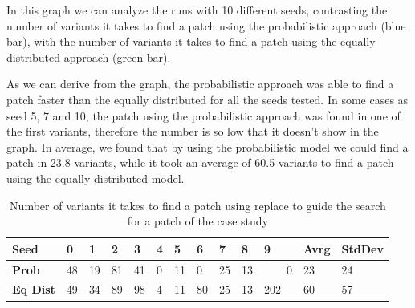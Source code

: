 \documentclass[conference]{IEEEtran}
\begin{document}
In this graph we can analyze the runs with 10 different seeds, contrasting the 
number of variants it takes to find a patch using the probabilistic approach 
(blue bar), with the number of variants it takes to find a patch using the 
equally distributed approach (green bar). 

As we can derive from the graph, the probabilistic approach was able to find a 
patch faster than the equally distributed for all the seeds tested. In some 
cases as seed 5, 7 and 10, the patch using the probabilistic approach was found 
in one of the first variants, therefore the number is so low that it doesn't 
show in the graph. In average, we found that by using the probabilistic model we 
could find a patch in 23.8 variants, while it took an average of 60.5 variants 
to find a patch using the equally distributed model.

\begin{table}[ht]
\begin{tabular}{lR{0.1cm}R{0.1cm}R{0.1cm}R{0.1cm}R{0.1cm}R{0.1cm}R{0.1cm}R{0.1cm}R{0.1cm}R{0.1cm}R{0.5cm}R{0.5cm}}
\hline
\textbf{Seed} & \textbf{0} & \textbf{1} & \textbf{2} & \textbf{3} & \textbf{4} & \textbf{5} & \textbf{6} & \textbf{7} & \textbf{8} & \textbf{9} & Avrg & StdDev  \\
\hline
\textbf{Prob} & 48 & 19 & 81 & 41 & 0 & 11 & 0 & 25 & 13 & ~~~~0 & 23 & 24 \\

\textbf{Eq Dist} & 49 & 34 & 89 & 98 & 4 & 11 & 80 & 25 & 13 & 202 & 60 & 57\\
\hline
\end{tabular}
%
\center
  \caption{Number of variants it takes to find a patch using replace to guide the search for a patch of the case study}
  \label{fig:resultsReplace}
\end{table} 

\end{document}
